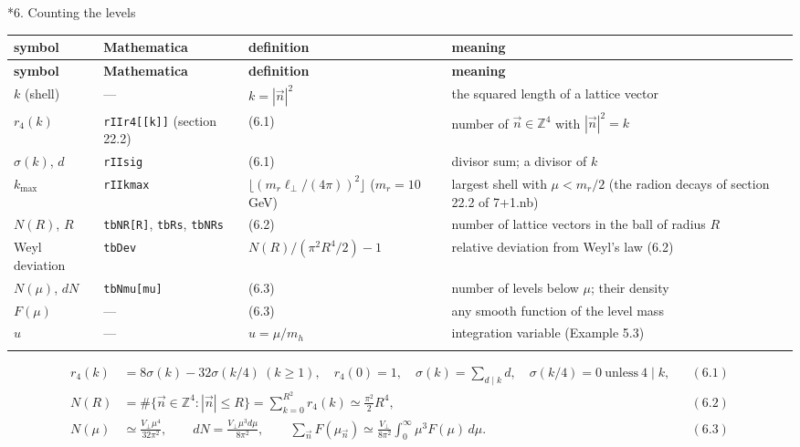 \documentclass[10pt,a4paper]{article}
\makeatletter
\renewcommand\section{\@startsection{section}{1}{\z@}{-3.5ex \@plus -1ex \@minus -.2ex}{2.3ex \@plus.2ex}{\normalfont\Large\bfseries\raggedright}}
\makeatother
\begin{document}
\section*{6. Counting the levels}
{\small
\begin{longtable}{>{\raggedright\arraybackslash}p{}>{\raggedright\arraybackslash}p{}>{\raggedright\arraybackslash}p{}>{\raggedright\arraybackslash}p{}}
\toprule
\textbf{symbol} & \textbf{Mathematica} & \textbf{definition} & \textbf{meaning} \\
\midrule\endfirsthead
\toprule
\textbf{symbol} & \textbf{Mathematica} & \textbf{definition} & \textbf{meaning} \\
\midrule\endhead
\endfoot
\bottomrule\endlastfoot
$k$ (shell) & — & $k=|\vec n|^2$ & the squared length of a lattice vector \\
$r_4(k)$ & \texttt{rIIr4[[k]]} (section 22.2) & (6.1) & number of $\vec n\in\mathbb Z^4$ with $|\vec n|^2=k$ \\
$\sigma(k)$, $d$ & \texttt{rIIsig} & (6.1) & divisor sum; a divisor of $k$ \\
$k_{\max}$ & \texttt{rIIkmax} & $\lfloor(m_r\ell_\perp/(4\pi))^2\rfloor$ ($m_r=10$ GeV) & largest shell with $\mu<m_r/2$ (the radion decays of section 22.2 of 7+1.nb) \\
$N(R)$, $R$ & \texttt{tbNR[R]}, \texttt{tbRs}, \texttt{tbNRs} & (6.2) & number of lattice vectors in the ball of radius $R$ \\
Weyl deviation & \texttt{tbDev} & $N(R)/(\pi^2R^4/2)-1$ & relative deviation from Weyl’s law (6.2) \\
$N(\mu)$, $dN$ & \texttt{tbNmu[mu]} & (6.3) & number of levels below $\mu$; their density \\
$F(\mu)$ & — & (6.3) & any smooth function of the level mass \\
$u$ & — & $u=\mu/m_h$ & integration variable (Example 5.3) \\*
\end{longtable}}
\begin{align*}
r_4(k)&=8\sigma(k)-32\sigma(k/4)\ (k\ge1),\quad r_4(0)=1,\quad \sigma(k)=\sum_{d\mid k}d,\quad \sigma(k/4)=0\ \text{unless}\ 4\mid k,&&(6.1) \\
N(R)&=\#\{\vec n\in\mathbb Z^4:|\vec n|\le R\}=\sum_{k=0}^{R^2}r_4(k)\simeq\frac{\pi^2}2R^4,&&(6.2) \\
N(\mu)&\simeq\frac{V_\perp\mu^4}{32\pi^2},\qquad dN=\frac{V_\perp\mu^3d\mu}{8\pi^2},\qquad \sum_{\vec n}F(\mu_{\vec n})\simeq\frac{V_\perp}{8\pi^2}\int_0^\infty\mu^3F(\mu)\,d\mu .&&(6.3)
\end{align*}
\end{document}
